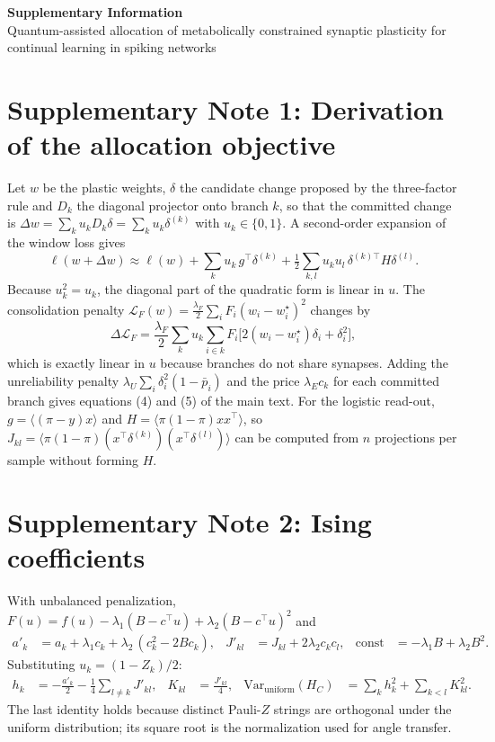 \documentclass[11pt,a4paper]{article}
\begin{document}
\begin{center}
{\Large\bfseries Supplementary Information}\\[0.5em]
{\large Quantum-assisted allocation of metabolically constrained synaptic plasticity for continual learning in spiking networks}
\end{center}

\section*{Supplementary Note 1: Derivation of the allocation objective}
Let $w$ be the plastic weights, $\delta$ the candidate change proposed by the three-factor rule and $D_k$ the diagonal projector onto branch $k$, so that the committed change is $\Delta w=\sum_k u_k D_k\delta=\sum_k u_k\delta^{(k)}$ with $u_k\in\{0,1\}$. A second-order expansion of the window loss gives
\begin{equation}
\ell(w+\Delta w)\approx\ell(w)+\sum_k u_k\,g^{\top}\delta^{(k)}+\tfrac12\sum_{k,l}u_ku_l\,\delta^{(k)\top}H\delta^{(l)} .
\end{equation}
Because $u_k^2=u_k$, the diagonal part of the quadratic form is linear in $u$. The consolidation penalty $\mathcal L_F(w)=\tfrac{\lambda_F}{2}\sum_iF_i(w_i-w_i^\star)^2$ changes by
\begin{equation}
\Delta\mathcal L_F=\frac{\lambda_F}{2}\sum_k u_k\sum_{i\in k}F_i\big[2(w_i-w_i^\star)\delta_i+\delta_i^2\big],
\end{equation}
which is exactly linear in $u$ because branches do not share synapses. Adding the unreliability penalty $\lambda_U\sum_i\delta_i^2(1-\bar p_i)$ and the price $\lambda_E c_k$ for each committed branch gives equations (4) and (5) of the main text. For the logistic read-out, $g=\langle(\pi-y)x\rangle$ and $H=\langle\pi(1-\pi)xx^{\top}\rangle$, so $J_{kl}=\langle\pi(1-\pi)(x^{\top}\delta^{(k)})(x^{\top}\delta^{(l)})\rangle$ can be computed from $n$ projections per sample without forming $H$.

\section*{Supplementary Note 2: Ising coefficients}
With unbalanced penalization, $F(u)=f(u)-\lambda_1(B-c^{\top}u)+\lambda_2(B-c^{\top}u)^2$ and
\begin{align}
a'_k&=a_k+\lambda_1c_k+\lambda_2\,(c_k^2-2Bc_k), & J'_{kl}&=J_{kl}+2\lambda_2c_kc_l, & \text{const}&=-\lambda_1B+\lambda_2B^2 .
\end{align}
Substituting $u_k=(1-Z_k)/2$:
\begin{align}
h_k&=-\frac{a'_k}{2}-\frac14\sum_{l\ne k}J'_{kl}, & K_{kl}&=\frac{J'_{kl}}{4}, & \mathrm{Var}_{\text{uniform}}(H_C)&=\sum_kh_k^2+\sum_{k<l}K_{kl}^2 .
\end{align}
The last identity holds because distinct Pauli-$Z$ strings are orthogonal under the uniform distribution; its square root is the normalization used for angle transfer.
\end{document}
